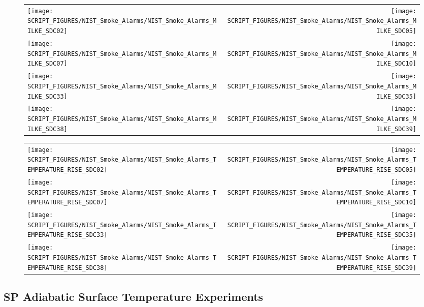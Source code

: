 \begin{figure}[p]
\begin{tabular*}{\textwidth}{l@{\extracolsep{\fill}}r}
\texttt{[image: SCRIPT\_FIGURES/NIST\_Smoke\_Alarms/NIST\_Smoke\_Alarms\_MILKE\_SDC02]} &
\texttt{[image: SCRIPT\_FIGURES/NIST\_Smoke\_Alarms/NIST\_Smoke\_Alarms\_MILKE\_SDC05]} \\
\texttt{[image: SCRIPT\_FIGURES/NIST\_Smoke\_Alarms/NIST\_Smoke\_Alarms\_MILKE\_SDC07]} &
\texttt{[image: SCRIPT\_FIGURES/NIST\_Smoke\_Alarms/NIST\_Smoke\_Alarms\_MILKE\_SDC10]} \\
\texttt{[image: SCRIPT\_FIGURES/NIST\_Smoke\_Alarms/NIST\_Smoke\_Alarms\_MILKE\_SDC33]} &
\texttt{[image: SCRIPT\_FIGURES/NIST\_Smoke\_Alarms/NIST\_Smoke\_Alarms\_MILKE\_SDC35]} \\
\texttt{[image: SCRIPT\_FIGURES/NIST\_Smoke\_Alarms/NIST\_Smoke\_Alarms\_MILKE\_SDC38]} &
\texttt{[image: SCRIPT\_FIGURES/NIST\_Smoke\_Alarms/NIST\_Smoke\_Alarms\_MILKE\_SDC39]}
\end{tabular*}
\end{figure}

\begin{figure}[p]
\begin{tabular*}{\textwidth}{l@{\extracolsep{\fill}}r}
\texttt{[image: SCRIPT\_FIGURES/NIST\_Smoke\_Alarms/NIST\_Smoke\_Alarms\_TEMPERATURE\_RISE\_SDC02]} &
\texttt{[image: SCRIPT\_FIGURES/NIST\_Smoke\_Alarms/NIST\_Smoke\_Alarms\_TEMPERATURE\_RISE\_SDC05]} \\
\texttt{[image: SCRIPT\_FIGURES/NIST\_Smoke\_Alarms/NIST\_Smoke\_Alarms\_TEMPERATURE\_RISE\_SDC07]} &
\texttt{[image: SCRIPT\_FIGURES/NIST\_Smoke\_Alarms/NIST\_Smoke\_Alarms\_TEMPERATURE\_RISE\_SDC10]} \\
\texttt{[image: SCRIPT\_FIGURES/NIST\_Smoke\_Alarms/NIST\_Smoke\_Alarms\_TEMPERATURE\_RISE\_SDC33]} &
\texttt{[image: SCRIPT\_FIGURES/NIST\_Smoke\_Alarms/NIST\_Smoke\_Alarms\_TEMPERATURE\_RISE\_SDC35]} \\
\texttt{[image: SCRIPT\_FIGURES/NIST\_Smoke\_Alarms/NIST\_Smoke\_Alarms\_TEMPERATURE\_RISE\_SDC38]} &
\texttt{[image: SCRIPT\_FIGURES/NIST\_Smoke\_Alarms/NIST\_Smoke\_Alarms\_TEMPERATURE\_RISE\_SDC39]}
\end{tabular*}
\end{figure}

\clearpage

\subsection{SP Adiabatic Surface Temperature Experiments}

